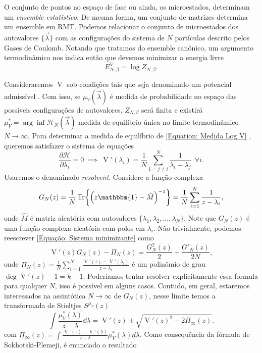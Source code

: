 \documentclass[11pt,twocolumn]{article}
\newcommand{\matriz}[1]{\hat#1}
\newcommand{\mmany}[2]{ #1_1, #1_2, \dots, #1_#2 }
\DeclareMathOperator{\V}{V}
\numberwithin{equation}{section} %
\begin{document}
O conjunto de pontos no espaço de fase ou ainda, os microestados, determinam um \textit{ensemble estatístico}. De mesma forma, um conjunto de matrizes determina um ensemble em RMT. Podemos relacionar o conjunto de microestados dos autovalores $\{\vec{\lambda}\}$ com as configurações do sistema de $N$ partículas descrito pelos Gases de Coulomb. Notando que tratamos do ensemble canônico, um argumento termodinâmico nos indica então que devemos minimizar a energia livre $$E^V_{N,\beta} = \log{Z_{N, \beta}}.$$

Consideraremos $\V$ sob condições tais que seja denominado um potencial admissível \cite{ChafaCoulombMeasure}. Com isso, se $\mu_{V}(\vec{\lambda})$ é medida de probabilidade no espaço das possíveis configurações de autovalores, $Z_{N, \beta}$ será finita e existirá $\mu_{V}^* = \arg \inf {\mathcal{H}_N(\vec{\lambda})}$ medida de equilíbrio única no limite termodinâmico $N \rightarrow \infty$. Para determinar a medida de equilíbrio de \ref{Equation: Medida Log V} \cite{RMT-firstcourse-Potters}, queremos satisfazer o sistema de equações
\begin{equation}
	\frac{\partial \mathcal{H}}{\partial \lambda_i} = 0 \ \implies \ \V'(\lambda_i) = \frac{1}{N} \sum_{1 = j \neq i}^{N} \frac{1}{\lambda_i - \lambda_j} \ \ \forall i.
	\label{Equação: Sistema minimizante}
\end{equation} 
Usaremos o denominado \textit{resolvent}. Considere a função complexa $$G_N(z) = \frac{1}{N} \Tr{\left(z \mathbbm{1} - \matriz{M}\right)^{-1}} = \frac{1}{N} \sum_{i=1}^{N} \frac{1}{z - \lambda_i},$$ onde $\matriz{M}$ é matriz aleatória com autovalores $\{\mmany{\lambda}{N}\}$. Note que $G_N(z)$ é uma função complexa aleatória com polos em $\lambda_i$. Não trivialmente, podemos reescrever \ref{Equação: Sistema minimizante} como $$\V'(z) G_N(z) - \Pi_N(z) = \frac{G_N^2(z)}{2} + \frac{G'_N(z)}{2N},$$ onde $\Pi_N(z) = \frac{1}{N} \sum_{i = 1}^{N} \frac{\V'(z) - \V'(\lambda_i)}{z - \lambda_i}$ é um polinômio de grau $\deg{\V'(z)} - 1 = k - 1$. Poderíamos tentar resolver explicitamente essa formula para qualquer $N$, isso é possível em alguns casos. Contudo, em geral, estaremos interessados na assintótica $N \to \infty$ de $G_N(z)$, nesse limite temos a transformada de Stieltjes $S^{\mu_V}(z)$
\begin{equation}
	\int \frac{\mu^*_V(\lambda)}{z - \lambda} \dd \lambda= \V'(z) \pm \sqrt{\V'(z)^2 - 2 \Pi_{\infty}(z) }.
	\label{Equation: Resolvent}
\end{equation}
com $\Pi_{\infty}(z) = \int \frac{\V'(z) - \V'(\lambda)}{z - \lambda} \mu^*_V(\lambda) d\lambda$. Como consequência da fórmula de Sokhotski-Plemeji, é enunciado o resultado 
\end{document}
